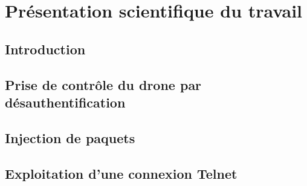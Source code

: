 \section{Présentation scientifique du travail}
\subsection{Introduction}




\subsection{Prise de contrôle du drone par désauthentification}

\subsection{Injection de paquets}

\subsection{Exploitation d'une connexion Telnet}
